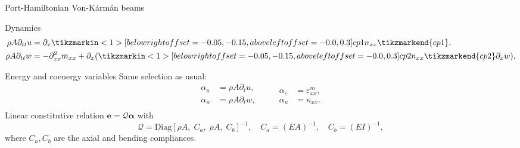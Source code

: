 \documentclass[serif]{beamer} %
\begin{document}
\begin{frame}{Port-Hamiltonian Von-K\'arm\'an beams}
	
\begin{block}{Dynamics}
	\begin{equation*}
		\begin{aligned}
			\rho A \partial_{tt}{u} &= \partial_x \tikzmarkin<1>[below right offset={-0.05,-0.15},above left offset={-0.0,0.3}]{cp1}n_{xx}\tikzmarkend{cp1}, \\
			\rho A \partial_{tt}{w} &= -\partial^2_{xx} m_{xx} + \partial_x(\tikzmarkin<1>[below right offset={-0.05,-0.15},above left offset={-0.0,0.3}]{cp2}n_{xx}\tikzmarkend{cp2} \partial_x w),
		\end{aligned} 
	\end{equation*}
\end{block}

\begin{block}{Energy and coenergy variables}
	Same selection as usual:
	\begin{equation*}
		\begin{aligned}
			\alpha_u &= \rho A \partial_t{u}, \\
			\alpha_w &= \rho A \partial_t{w},\\
		\end{aligned} \qquad
		\begin{aligned}
			\alpha_\varepsilon &= \varepsilon_{xx}^m, \\
			\alpha_\kappa &= \kappa_{xx}.
		\end{aligned}
	\end{equation*}
	Linear constitutive relation $\bm{e} = \mathcal{Q} \bm{\alpha}$ with
	\begin{equation*}
		\mathcal{Q} = \mathrm{Diag}\left[\rho A, \; C_a, \; \rho A, \; C_b\right]^{-1}, \quad C_a = (EA)^{-1}, \quad C_b = (EI)^{-1},
	\end{equation*}
where $C_a, C_b$ are the axial and bending compliances.
\end{block}

\end{frame}
\end{document}
